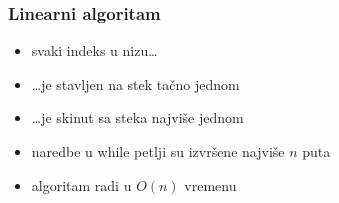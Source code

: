 \documentclass[compress,aspectratio=169]{beamer}
\begin{document}
\begin{frame}[fragile]
  \frametitle{Linearni algoritam}
  \begin{itemize}
    \item svaki indeks u nizu\ldots
    \item \ldots je stavljen na stek tačno jednom
    \item \ldots je skinut sa steka najviše jednom
    \item naredbe u while petlji su izvršene najviše $n$ puta
    \item algoritam radi u $O(n)$ vremenu
  \end{itemize}
\end{frame}
\end{document}
